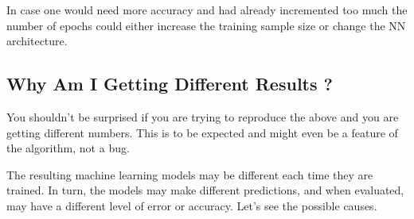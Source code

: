 In case one would need more accuracy and had already incremented too much the number of epochs could either increase the training sample size or change the NN architecture.

\subsection{Why Am I Getting Different Results ?}

You shouldn't be surprised if you are trying to reproduce the above and you are getting different numbers. This is to be expected and might even be a feature of the algorithm, not a bug.


The resulting machine learning models may be different each time they are trained. In turn, the models may make different predictions, and when evaluated, may have a different level of error or accuracy. Let's see the possible causes.


